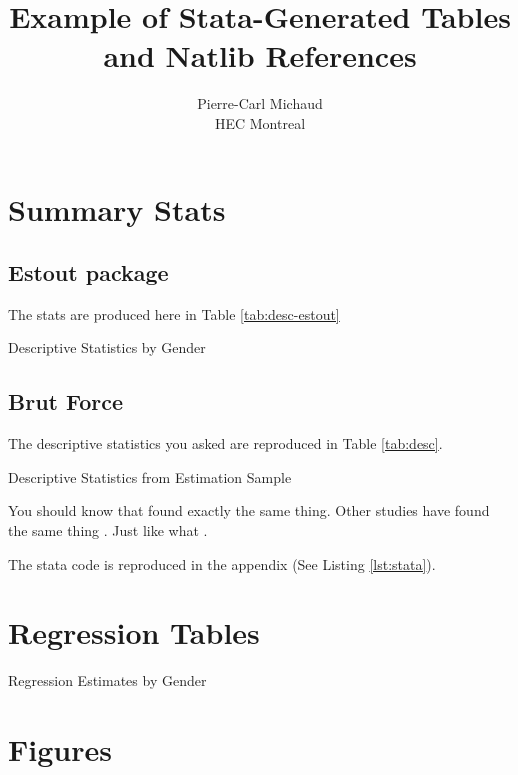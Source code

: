 \documentclass[11pt, oneside]{article}   	%
\title{Example of Stata-Generated Tables and Natlib References}
\author{Pierre-Carl Michaud \\ HEC Montreal}
\begin{document}
\maketitle

\section{Summary Stats}

\subsection{Estout package}

The stats are produced here in Table \ref{tab:desc-estout}

\begin{table}[htp]
  \centering
  
  \caption{Descriptive Statistics by Gender}
  \label{tab:desc-estout}
\end{table}

\subsection{Brut Force}
The descriptive statistics you asked are reproduced in Table \ref{tab:desc}. 

\begin{table}[htp]
\centering

\caption{Descriptive Statistics from Estimation Sample}
\label{tab:desc}
\end{table}

You should know that \citep{lusardi_financial_2007} found exactly the same thing. Other studies have found the same thing \citet{Lusardi2017OptimalInequality}. Just like what \citet{Card1990TheMarket}.


The stata code is reproduced in the appendix (See Listing \ref{lst:stata}). 

\section{Regression Tables}

\begin{table}[htp]
  \centering
  
  \caption{Regression Estimates by Gender}
  \label{tab:reg-gender}
\end{table}

\section{Figures}
\end{document}
